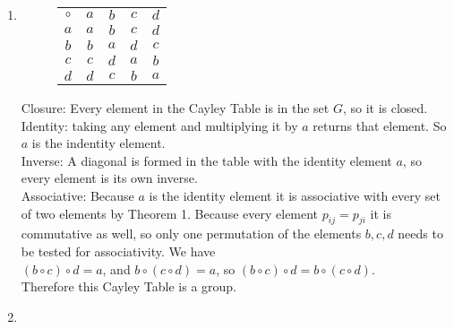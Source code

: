 \documentclass[12pt]{article}
\newlength{\strutheight}
\begin{document}
\begin{enumerate}[label=\textbf{\arabic*}.]
\begin{enumerate}
\begin{adjustbox}{valign=T,raise=\strutheight,minipage={1.0\linewidth}}
\begin{align*}
				            \implies a \circ (b \circ c) & \neq (a \circ b) \circ c
			            \end{align*}
		            \end{adjustbox}
		            \\ \\ \\
		      \item \begin{adjustbox}{valign=T,raise=\strutheight,minipage={1.0\linewidth}}
			            \begin{wrapfigure}{l}{0pt}
				            \begin{tabular}{c|cccc}
					            $\circ$ & $a$ & $b$ & $c$ & $d$ \\
					            \cline{1-5}
					            $a$     & $a$ & $b$ & $c$ & $d$ \\
					            $b$     & $b$ & $a$ & $d$ & $c$ \\
					            $c$     & $c$ & $d$ & $a$ & $b$ \\
					            $d$     & $d$ & $c$ & $b$ & $a$ \\
				            \end{tabular}
			            \end{wrapfigure}
			            Closure: Every element in the Cayley Table is in the set $G$, so it is closed. \\
			            Identity: taking any element and multiplying it by $a$ returns that element. So $a$ is the indentity element. \\
			            Inverse: A diagonal is formed in the table with the identity element $a$, so every element is its own inverse. \\
			            Associative: Because $a$ is the identity element it is associative with every set of two elements by Theorem 1.
			            Because every element $p_{ij} = p_{ji}$ it is commutative as well, so only one permutation
			            of the elements $b,c,d$ needs to be tested for associativity. We have \\
			            \((b \circ c) \circ d = a\), and \(b \circ (c \circ d) = a\), so
			            \((b \circ c) \circ d = b \circ (c \circ d)\). \\
			            Therefore this Cayley Table is a group.
		            \end{adjustbox}
		            \pagebreak
		      \item \begin{adjustbox}{valign=T,raise=\strutheight,minipage={1.0\linewidth}}

\end{adjustbox}
\end{enumerate}
\end{enumerate}
\end{document}
